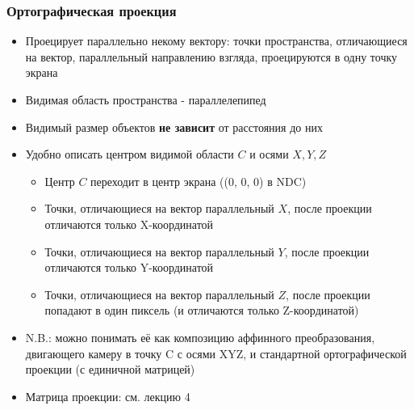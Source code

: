 \documentclass{beamer}
\begin{document}
\begin{frame}[fragile]
\frametitle{Ортографическая проекция}
\fontsize{10pt}{10pt}
\begin{itemize}
\item Проецирует параллельно некому вектору: точки пространства, отличающиеся на вектор, параллельный направлению взгляда, проецируются в одну точку экрана
\pause
\item Видимая область пространства - параллелепипед
\pause
\item Видимый размер объектов \textbf{не зависит} от расстояния до них
\pause
\item Удобно описать центром видимой области \begin{math}C\end{math} и осями \begin{math}X, Y, Z\end{math}
\pause
\begin{itemize}
\item Центр \begin{math}C\end{math} переходит в центр экрана ((0, 0, 0) в NDC)
\pause
\item Точки, отличающиеся на вектор параллельный \begin{math}X\end{math}, после проекции отличаются только X-координатой
\pause
\item Точки, отличающиеся на вектор параллельный \begin{math}Y\end{math}, после проекции отличаются только Y-координатой
\pause
\item Точки, отличающиеся на вектор параллельный \begin{math}Z\end{math}, после проекции попадают в один пиксель (и отличаются только Z-координатой)
\end{itemize}
\pause
\item N.B.: можно понимать её как композицию аффинного преобразования, двигающего камеру в точку C с осями XYZ, и стандартной ортографической проекции (с единичной матрицей)
\pause
\item Матрица проекции: см. лекцию 4
\end{itemize}
\end{frame}
\end{document}
